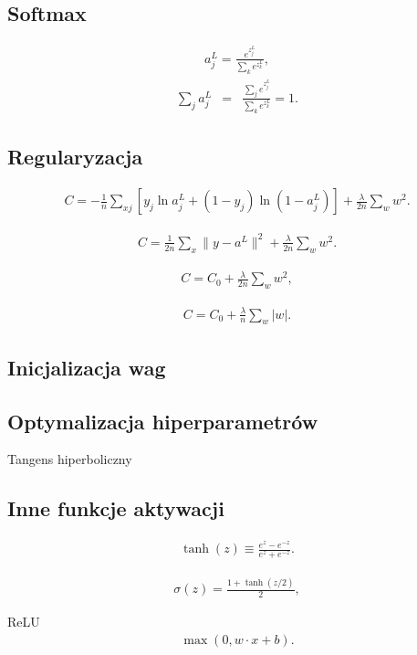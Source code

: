 \documentclass[10pt, oneside]{article}
\theoremstyle{remark}
\begin{document}
\subsection{Softmax}


\begin{eqnarray} 
  a^L_j = \frac{e^{z^L_j}}{\sum_k e^{z^L_k}},
\end{eqnarray}
\begin{eqnarray}
  \sum_j a^L_j & = & \frac{\sum_j e^{z^L_j}}{\sum_k e^{z^L_k}} = 1.
\end{eqnarray}

\subsection{Regularyzacja}
\begin{eqnarray} C = -\frac{1}{n} \sum_{xj} \left[ y_j \ln a^L_j+(1-y_j) \ln
(1-a^L_j)\right] + \frac{\lambda}{2n} \sum_w w^2.
\end{eqnarray}

\begin{eqnarray} C = \frac{1}{2n} \sum_x \|y-a^L\|^2 +
  \frac{\lambda}{2n} \sum_w w^2.
\end{eqnarray}

\begin{eqnarray}  C = C_0 + \frac{\lambda}{2n}
\sum_w w^2,
\end{eqnarray}

\begin{eqnarray}  C = C_0 + \frac{\lambda}{n} \sum_w |w|.
\end{eqnarray}

\subsection{Inicjalizacja wag}

\subsection{Optymalizacja hiperparametrów}

Tangens hiperboliczny

\subsection{Inne funkcje aktywacji}
\begin{eqnarray}
  \tanh(z) \equiv \frac{e^z-e^{-z}}{e^z+e^{-z}}.
\end{eqnarray}

\begin{eqnarray} 
  \sigma(z) = \frac{1+\tanh(z/2)}{2},
\end{eqnarray}

ReLU
\begin{eqnarray}
  \max(0, w \cdot x+b).
\end{eqnarray}
\end{document}
